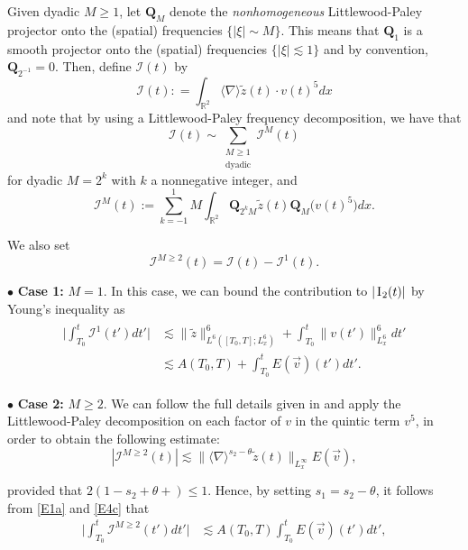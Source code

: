 \documentclass[letterpaper, 11pt,  reqno]{amsart}
\newcommand{\1}{\hspace{0.5mm}\text{I}\hspace{0.2mm}}
\newcommand{\I}{\mathcal{I}}
\newcommand{\noi}{\noindent}
\newcommand{\R}{\mathbb{R}}
\newcommand{\Q}{\mathbf{Q}}
\newcommand{\nb}{\nabla}
\newcommand{\wt}{\widetilde}
\newcommand{\ta}{\theta}
\newcommand{\les}{\lesssim}
\newcommand{\jb}[1]
{\langle #1 \rangle}
\numberwithin{equation}{section}
\numberwithin{theorem}{section}
\begin{document}
\noi
Given dyadic $M \geq 1$, let $\Q_M$
denote the \textit{nonhomogeneous} Littlewood-Paley projector onto the (spatial)
frequencies $\{|\xi|\sim M\}$. This means that $\Q_1$ is a smooth  projector onto the (spatial)
frequencies $\{|\xi|\les 1\}$ and by convention, $\Q_{2^{-1}} = 0$.
Then, 
define $\mathcal{I}(t)$ by 
\begin{equation*}
\I (t) : \!  =  \int_{\R^2} \jb{\nabla} \wt z (t)  \cdot v(t) ^5 dx
\end{equation*} 
and note that by using a Littlewood-Paley frequency decomposition, we have that
\begin{equation}\label{dyadicI2}
\mathcal{I}(t) \sim \sum_{\substack{M \geq 1\\ \text{dyadic}}}\I^M(t)
\end{equation}
for dyadic $M = 2^{k}$ with $k$ a nonnegative integer, and 
\begin{equation*}
\mathcal{I}^{M}(t) := \sum_{k = -1}^1
M \int_{\R^2} \Q_{2^k M} \wt z (t)  \Q_M\big( v(t) ^5\big) dx.
\end{equation*}


\noi
We also set 
\[\I^{M\geq 2}(t) = \I(t) - \I^1(t).\]

\medskip



\noi
$\bullet$ {\bf Case 1:} $M = 1$.
\quad 
In this case, we can bound the contribution 
to $|\1_2(t)|$ 
by Young's inequality as
\begin{align}
\begin{split}
\bigg|\int_{T_0}^t \I^1(t') dt'\bigg|
& \les \|\wt z \|_{L^6([T_0, T]; L^6_x)}^6
+ \int_{T_0}^t \|v (t')  \|_{L^6_{x}}^6 dt'\\
& \les A(T_0, T)
+ \int_{T_0}^t E(\vec v)(t') dt'.
\end{split}
\label{E4b}
\end{align}


\smallskip

\noi
$\bullet$ {\bf Case 2:} $M \geq 2$.
\quad 
We can follow the full details given in \cite{OP} and apply the Littlewood-Paley decomposition on each factor of $v$ in the quintic term $v^{5}$, in order to obtain the following estimate:
\begin{equation}
 |\I^{M\ge 2} (t)| \les 
\big\|\jb{\nb}^{s_2-\ta} \wt  z(t)\big\|_{L^\infty_x}E(\vec v),
\label{E4c}
\end{equation}

\noi
provided that $2(1-s_2+\ta+) \leq 1$.
Hence, 
by setting  $s_1 = s_2 -\ta$, it follows 
from \eqref{E1a} and \eqref{E4c} that 
\begin{align}
 \bigg|\int_{T_0}^t \I^{M\ge 2} (t')dt'\bigg|
& \les 
A(T_0, T) \int_{T_0}^t E(\vec v)(t') dt',
\label{E4d}
\end{align}
\end{document}
